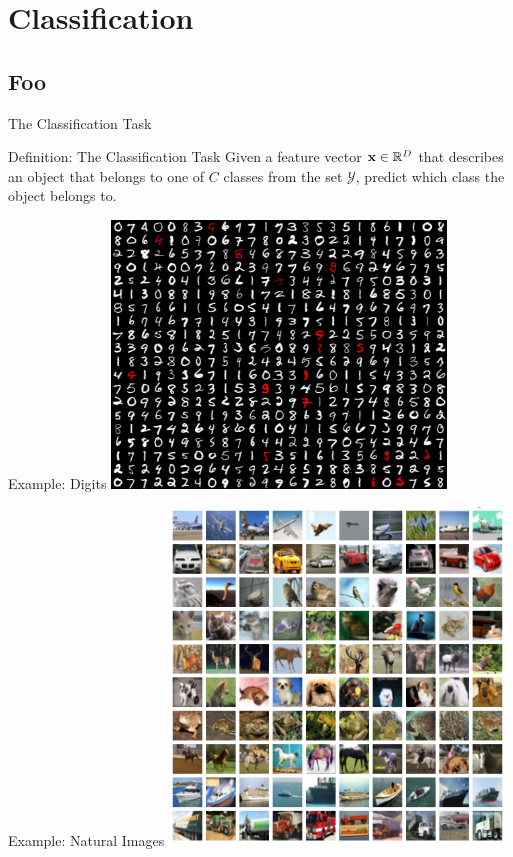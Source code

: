 \documentclass[serif,xcolor=pdftex,dvipsnames,table,hyperref={bookmarks=false}]{beamer}
\begin{document}
\section{Classification}
\subsection{Foo}

\begin{frame}[t]{The Classification Task}

\begin{block}{Definition: The Classification Task}
Given a feature vector ${\mathbf{x}}\in\mathbb{R}^D$ that describes an object that belongs to one of $C$ classes from the set $\mathcal{Y}$, predict which class the object belongs to.
\end{block}

\end{frame}

\begin{frame}[t]{Example: Digits}
 \centering
 \includegraphics[width=3.5in]{../Figures/mnist.png}
\end{frame}

\begin{frame}[t]{Example: Natural Images}
 \centering
 \includegraphics[width=3.5in]{../Figures/cifar.png}
\end{frame}
\end{document}
